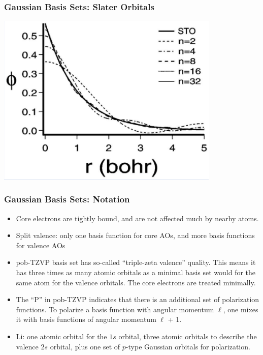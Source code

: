\documentclass{beamer}
\newenvironment{noheadline}{
	\setbeamertemplate{headline}{}
	\addtobeamertemplate{frametitle}{\vspace*{-0.9\baselineskip}}{}
}{}
\begin{document}
\begin{noheadline}
\begin{frame}
\frametitle{Gaussian Basis Sets: Slater Orbitals}
\begin{center}
	\includegraphics[trim={0cm 0cm 0cm 0cm},clip,width=0.8\textwidth]{figures/Slater_vs_Gaussian.PNG}
\end{center}
\end{frame}

\begin{frame}
\frametitle{Gaussian Basis Sets: Notation}
\begin{itemize}
	\item Core electrons are tightly bound, and are not affected much by nearby atoms.
	\item Split valence: only one basis function for core AOs, and more basis functions for valence AOs
	\item pob-TZVP basis set has so-called ``triple-zeta valence'' quality. This means it has three times as many atomic orbitals as a minimal basis set would for the same atom for the valence orbitals. The core electrons are treated minimally.
	\item The ``P'' in pob-TZVP indicates that there is an additional set of polarization functions. To polarize a basis function with angular momentum $\ell$, one mixes it with basis functions of angular momentum $\ell$ + 1.
	\item Li: one atomic orbital for the $1s$ orbital, three atomic orbitals to describe the valence $2s$ orbital, plus one set of $p$-type Gaussian orbitals for polarization.
\end{itemize}
\end{frame}



\end{noheadline}
\end{document}

